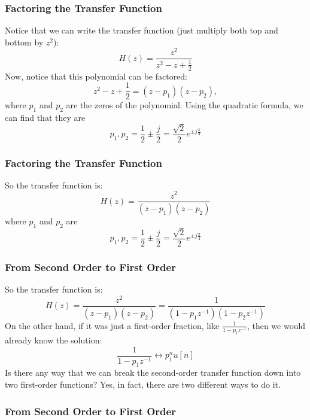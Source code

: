 \begin{frame}
  \frametitle{Factoring the Transfer Function}

  Notice that we can write the transfer function (just multiply both
  top and bottom by $z^2$):
  \[
  H(z) = \frac{z^2}{z^2-z+\frac{1}{2}}
  \]
  Now, notice that this polynomial can be factored:
  \[
  z^2-z+\frac{1}{2} = (z-p_1)(z-p_2),
  \]
  where $p_1$ and $p_2$ are the zeros of the polynomial.  Using the
  quadratic formula, we can find that they are
  \[
  p_1,p_2 = \frac{1}{2}\pm \frac{j}{2} = \frac{\sqrt{2}}{2}e^{\pm j\frac{\pi}{4}}
  \]
\end{frame}

\begin{frame}
  \frametitle{Factoring the Transfer Function}

  So the transfer function is:
  \[
  H(z) = \frac{z^2}{(z-p_1)(z-p_2)}
  \]
  where $p_1$ and $p_2$ are
  \[
  p_1,p_2 = \frac{1}{2}\pm \frac{j}{2} = \frac{\sqrt{2}}{2}e^{\pm j\frac{\pi}{4}}
  \]
\end{frame}

\begin{frame}
  \frametitle{From Second Order to First Order}

  So the transfer function is:
  \[
  H(z) = \frac{z^2}{(z-p_1)(z-p_2)} = \frac{1}{(1-p_1z^{-1})(1-p_2z^{-1})}
  \]
  On the other hand, if it was just a first-order fraction, like $\frac{1}{1-p_1z^{-1}}$, then
  we would already know the solution:
  \[
  \frac{1}{1-p_1z^{-1}} \leftrightarrow p_1^n u[n]
  \]
  Is there any way that we can break the second-order transfer function down into
  two first-order functions?  Yes, in fact, there are two different ways to do it.
\end{frame}

\begin{frame}
  \frametitle{From Second Order to First Order}

\end{frame}

